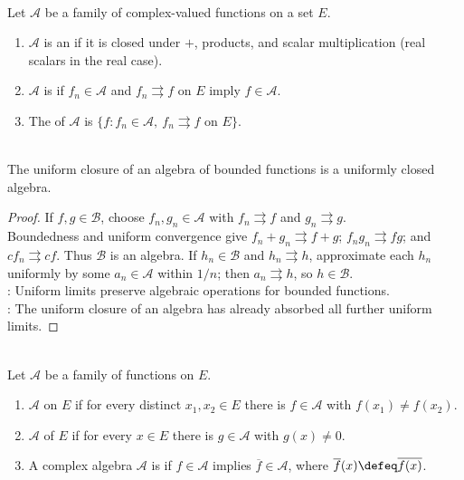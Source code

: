 \begin{definition} \label{def:algebra-uniform-closure-functions} \\
Let $\mathcal{A}$ be a family of complex-valued functions on a set $E$.
\begin{enumerate}[label=(\roman*)]
\setlength{\itemsep}{0pt}
\item $\mathcal{A}$ is an  if it is closed under $+$, products, and scalar multiplication (real scalars in the real case).
\item $\mathcal{A}$ is  if $f_n\in\mathcal{A}$ and $f_n\rightrightarrows f$ on $E$ imply $f\in\mathcal{A}$.
\item The  of $\mathcal{A}$ is $\{f:f_n\in\mathcal{A},\ f_n\rightrightarrows f\text{ on }E\}$.
\end{enumerate}
\end{definition}

\begin{theorem} \label{thm:uniform-closure-algebra} \\
The uniform closure of an algebra of bounded functions is a uniformly closed algebra.
\begin{proof}
If $f,g\in\mathcal{B}$, choose $f_n,g_n\in\mathcal{A}$ with $f_n\rightrightarrows f$ and $g_n\rightrightarrows g$.\\
Boundedness and uniform convergence give $f_n+g_n\rightrightarrows f+g$; $f_ng_n\rightrightarrows fg$; and $cf_n\rightrightarrows cf$.
Thus $\mathcal{B}$ is an algebra. If $h_n\in\mathcal{B}$ and $h_n\rightrightarrows h$, approximate each $h_n$ uniformly by some $a_n\in\mathcal{A}$ within $1/n$; then $a_n\rightrightarrows h$, so $h\in\mathcal{B}$.\\
: Uniform limits preserve algebraic operations for bounded functions.\\
: The uniform closure of an algebra has already absorbed all further uniform limits.
\end{proof}
\end{theorem}

\begin{definition} \label{def:separates-points-vanishes-nowhere-self-adjoint} \\
Let $\mathcal{A}$ be a family of functions on $E$.
\begin{enumerate}[label=(\roman*)]
\setlength{\itemsep}{0pt}
\item $\mathcal{A}$  on $E$ if for every distinct $x_1,x_2\in E$ there is $f\in\mathcal{A}$ with $f(x_1)\neq f(x_2)$.
\item $\mathcal{A}$  of $E$ if for every $x\in E$ there is $g\in\mathcal{A}$ with $g(x)\neq0$.
\item A complex algebra $\mathcal{A}$ is  if $f\in\mathcal{A}$ implies $\overline{f}\in\mathcal{A}$, where $\overline{f}(x)\defeq\overline{f(x)}$.
\end{enumerate}
\end{definition}

